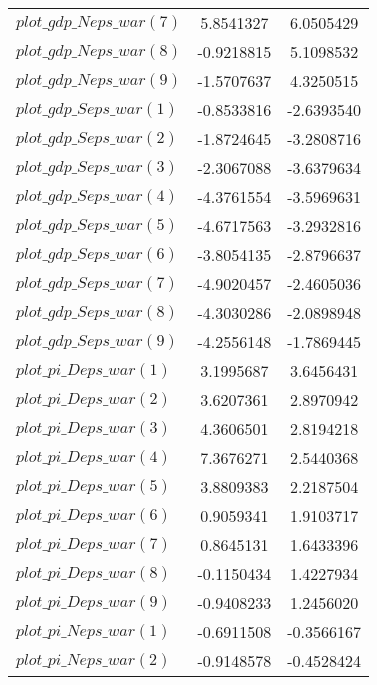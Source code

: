 \begin{center}
\begin{longtable}{lcc}
$plot\_gdp\_N eps\_war (7)  $	 & 	      5.8541327	 & 	      6.0505429 \\ 
$plot\_gdp\_N eps\_war (8)  $	 & 	     -0.9218815	 & 	      5.1098532 \\ 
$plot\_gdp\_N eps\_war (9)  $	 & 	     -1.5707637	 & 	      4.3250515 \\ 
$plot\_gdp\_S eps\_war (1)  $	 & 	     -0.8533816	 & 	     -2.6393540 \\ 
$plot\_gdp\_S eps\_war (2)  $	 & 	     -1.8724645	 & 	     -3.2808716 \\ 
$plot\_gdp\_S eps\_war (3)  $	 & 	     -2.3067088	 & 	     -3.6379634 \\ 
$plot\_gdp\_S eps\_war (4)  $	 & 	     -4.3761554	 & 	     -3.5969631 \\ 
$plot\_gdp\_S eps\_war (5)  $	 & 	     -4.6717563	 & 	     -3.2932816 \\ 
$plot\_gdp\_S eps\_war (6)  $	 & 	     -3.8054135	 & 	     -2.8796637 \\ 
$plot\_gdp\_S eps\_war (7)  $	 & 	     -4.9020457	 & 	     -2.4605036 \\ 
$plot\_gdp\_S eps\_war (8)  $	 & 	     -4.3030286	 & 	     -2.0898948 \\ 
$plot\_gdp\_S eps\_war (9)  $	 & 	     -4.2556148	 & 	     -1.7869445 \\ 
$plot\_pi\_D eps\_war (1)   $	 & 	      3.1995687	 & 	      3.6456431 \\ 
$plot\_pi\_D eps\_war (2)   $	 & 	      3.6207361	 & 	      2.8970942 \\ 
$plot\_pi\_D eps\_war (3)   $	 & 	      4.3606501	 & 	      2.8194218 \\ 
$plot\_pi\_D eps\_war (4)   $	 & 	      7.3676271	 & 	      2.5440368 \\ 
$plot\_pi\_D eps\_war (5)   $	 & 	      3.8809383	 & 	      2.2187504 \\ 
$plot\_pi\_D eps\_war (6)   $	 & 	      0.9059341	 & 	      1.9103717 \\ 
$plot\_pi\_D eps\_war (7)   $	 & 	      0.8645131	 & 	      1.6433396 \\ 
$plot\_pi\_D eps\_war (8)   $	 & 	     -0.1150434	 & 	      1.4227934 \\ 
$plot\_pi\_D eps\_war (9)   $	 & 	     -0.9408233	 & 	      1.2456020 \\ 
$plot\_pi\_N eps\_war (1)   $	 & 	     -0.6911508	 & 	     -0.3566167 \\ 
$plot\_pi\_N eps\_war (2)   $	 & 	     -0.9148578	 & 	     -0.4528424 \\ 

\end{longtable}
\end{center}
